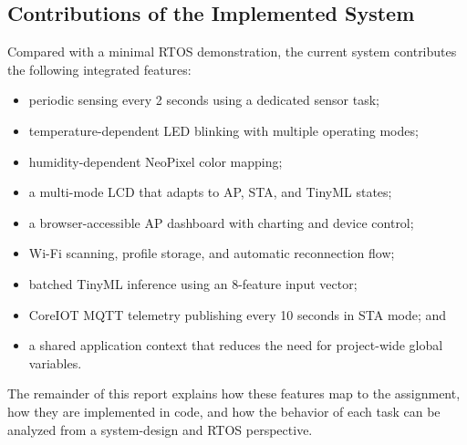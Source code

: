 \subsection{Contributions of the Implemented System}
Compared with a minimal RTOS demonstration, the current system contributes the
following integrated features:
\begin{itemize}
  \item periodic sensing every 2 seconds using a dedicated sensor task;
  \item temperature-dependent LED blinking with multiple operating modes;
  \item humidity-dependent NeoPixel color mapping;
  \item a multi-mode LCD that adapts to AP, STA, and TinyML states;
  \item a browser-accessible AP dashboard with charting and device control;
  \item Wi-Fi scanning, profile storage, and automatic reconnection flow;
  \item batched TinyML inference using an 8-feature input vector;
  \item CoreIOT MQTT telemetry publishing every 10 seconds in STA mode; and
  \item a shared application context that reduces the need for project-wide
    global variables.
\end{itemize}

The remainder of this report explains how these features map to the assignment,
how they are implemented in code, and how the behavior of each task can be
analyzed from a system-design and RTOS perspective.
